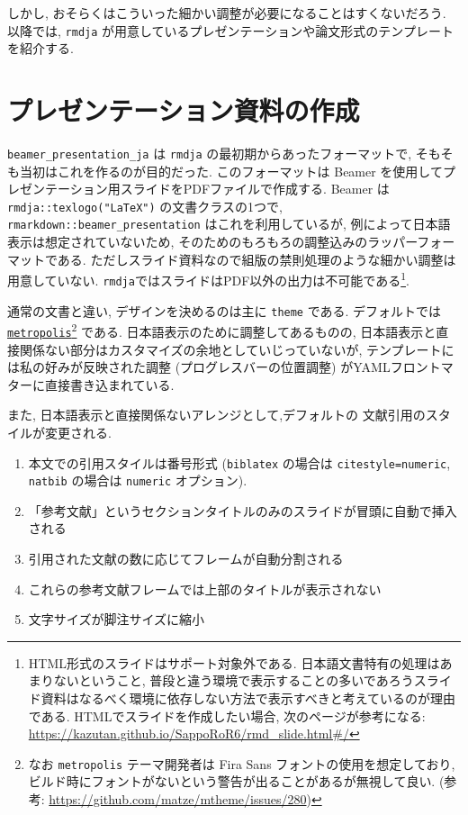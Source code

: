\documentclass[
]{bxjsbook}
\providecommand{\tightlist}{%
  \setlength{\itemsep}{0pt}\setlength{\parskip}{0pt}}
\theoremstyle{definition}
\theoremstyle{definition}
\theoremstyle{definition}
\theoremstyle{remark}
\begin{document}
しかし, おそらくはこういった細かい調整が必要になることはすくないだろう.
以降では, \texttt{rmdja}
が用意しているプレゼンテーションや論文形式のテンプレートを紹介する.

\hypertarget{ux30d7ux30ecux30bcux30f3ux30c6ux30fcux30b7ux30e7ux30f3ux8cc7ux6599ux306eux4f5cux6210}{%
\section{プレゼンテーション資料の作成}\label{ux30d7ux30ecux30bcux30f3ux30c6ux30fcux30b7ux30e7ux30f3ux8cc7ux6599ux306eux4f5cux6210}}

\texttt{beamer\_presentation\_ja} は \texttt{rmdja}
の最初期からあったフォーマットで,
そもそも当初はこれを作るのが目的だった. このフォーマットは Beamer
を使用してプレゼンテーション用スライドをPDFファイルで作成する. Beamer は
\texttt{rmdja::texlogo("LaTeX")} の文書クラスの1つで,
\texttt{rmarkdown::beamer\_presentation} はこれを利用しているが,
例によって日本語表示は想定されていないため,
そのためのもろもろの調整込みのラッパーフォーマットである.
ただしスライド資料なので組版の禁則処理のような細かい調整は用意していない.
\texttt{rmdja}ではスライドはPDF以外の出力は不可能である\footnote{HTML形式のスライドはサポート対象外である.
  日本語文書特有の処理はあまりないということ,
  普段と違う環境で表示することの多いであろうスライド資料はなるべく環境に依存しない方法で表示すべきと考えているのが理由である.
  HTMLでスライドを作成したい場合, 次のページが参考になる:
  \url{https://kazutan.github.io/SappoRoR6/rmd_slide.html\#/}}.

通常の文書と違い, デザインを決めるのは主に \texttt{theme} である.
デフォルトでは
\href{https://github.com/matze/mtheme}{\texttt{metropolis}}\footnote{なお
  \texttt{metropolis} テーマ開発者は Fira Sans
  フォントの使用を想定しており,
  ビルド時にフォントがないという警告が出ることがあるが無視して良い.
  (参考: \url{https://github.com/matze/mtheme/issues/280})} である.
日本語表示のために調整してあるものの,
日本語表示と直接関係ない部分はカスタマイズの余地としていじっていないが,
テンプレートには私の好みが反映された調整 (プログレスバーの位置調整)
がYAMLフロントマターに直接書き込まれている.

また, 日本語表示と直接関係ないアレンジとして,デフォルトの
文献引用のスタイルが変更される.

\begin{enumerate}
\def\labelenumi{\arabic{enumi}.}
\tightlist
\item
  本文での引用スタイルは番号形式 (\texttt{biblatex} の場合は
  \texttt{citestyle=numeric}, \texttt{natbib} の場合は \texttt{numeric}
  オプション).
\item
  「参考文献」というセクションタイトルのみのスライドが冒頭に自動で挿入される
\item
  引用された文献の数に応じてフレームが自動分割される
\item
  これらの参考文献フレームでは上部のタイトルが表示されない
\item
  文字サイズが脚注サイズに縮小
\end{enumerate}
\end{document}
